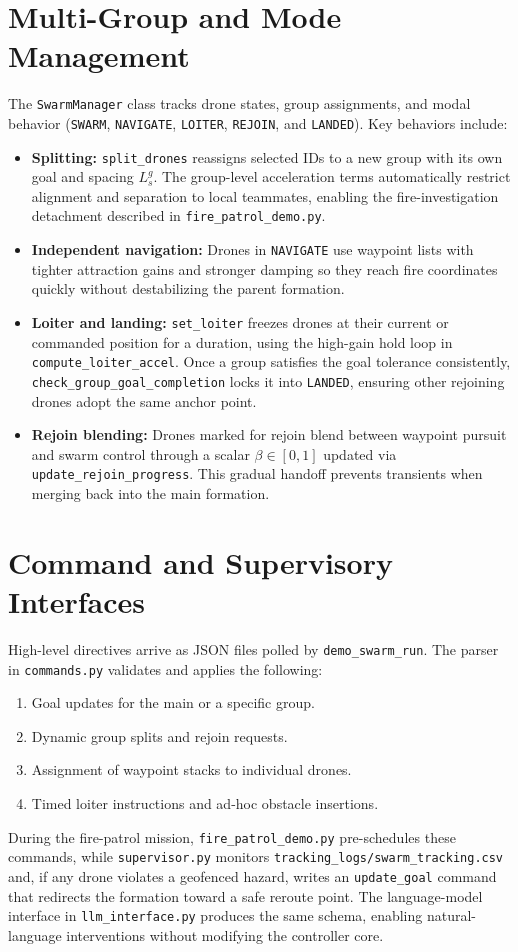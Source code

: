 \documentclass[conference]{AIAA}
\begin{document}
\section{Multi-Group and Mode Management}
The \texttt{SwarmManager} class tracks drone states, group assignments, and modal behavior (\texttt{SWARM}, \texttt{NAVIGATE}, \texttt{LOITER}, \texttt{REJOIN}, and \texttt{LANDED}).  Key behaviors include:
\begin{itemize}
	\item \textbf{Splitting:} \texttt{split\_drones} reassigns selected IDs to a new group with its own goal and spacing \(L_s^g\).  The group-level acceleration terms automatically restrict alignment and separation to local teammates, enabling the fire-investigation detachment described in \texttt{fire\_patrol\_demo.py}.
	\item \textbf{Independent navigation:} Drones in \texttt{NAVIGATE} use waypoint lists with tighter attraction gains and stronger damping so they reach fire coordinates quickly without destabilizing the parent formation.
	\item \textbf{Loiter and landing:} \texttt{set\_loiter} freezes drones at their current or commanded position for a duration, using the high-gain hold loop in \texttt{compute\_loiter\_accel}.  Once a group satisfies the goal tolerance consistently, \texttt{check\_group\_goal\_completion} locks it into \texttt{LANDED}, ensuring other rejoining drones adopt the same anchor point.
	\item \textbf{Rejoin blending:} Drones marked for rejoin blend between waypoint pursuit and swarm control through a scalar \(\beta \in [0,1]\) updated via \texttt{update\_rejoin\_progress}.  This gradual handoff prevents transients when merging back into the main formation.
\end{itemize}

\section{Command and Supervisory Interfaces}
High-level directives arrive as JSON files polled by \texttt{demo\_swarm\_run}.  The parser in \texttt{commands.py} validates and applies the following:
\begin{enumerate}
	\item Goal updates for the main or a specific group.
	\item Dynamic group splits and rejoin requests.
	\item Assignment of waypoint stacks to individual drones.
	\item Timed loiter instructions and ad-hoc obstacle insertions.
\end{enumerate}
	During the fire-patrol mission, \texttt{fire\_patrol\_demo.py} pre-schedules these commands, while \texttt{supervisor.py} monitors \texttt{tracking\_logs/swarm\_tracking.csv} and, if any drone violates a geofenced hazard, writes an \texttt{update\_goal} command that redirects the formation toward a safe reroute point.  The language-model interface in \texttt{llm\_interface.py} produces the same schema, enabling natural-language interventions without modifying the controller core.
\end{document}
